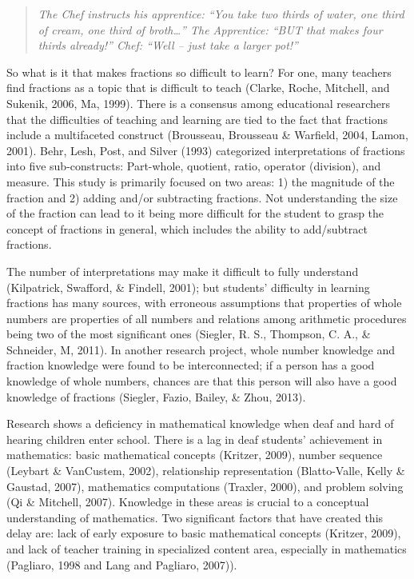 \documentclass[11.5pt]{sig-alternate} %
\begin{document}
\begin{large}
\begin{quote}
\textit{The Chef instructs his apprentice: “You take two thirds of water, one third of cream, one third of broth…” The Apprentice: “BUT that makes four thirds already!” Chef: “Well – just take a larger pot!”}
\end{quote}

So what is it that makes fractions so difficult to learn? For one, many teachers find fractions as a topic that is difficult to teach (Clarke, Roche, Mitchell, and Sukenik, 2006, Ma, 1999). There is a consensus among educational researchers that the difficulties of teaching and learning are tied to the fact that fractions include a multifaceted construct (Brousseau, Brousseau \& Warfield, 2004, Lamon, 2001).  Behr, Lesh, Post, and Silver (1993) categorized interpretations of fractions into five sub-constructs: Part-whole, quotient, ratio, operator (division), and measure. This study is primarily focused on two areas: 1) the magnitude of the fraction and 2) adding and/or subtracting fractions. Not understanding the size of the fraction can lead to it being more difficult for the student to grasp the concept of fractions in general, which includes the ability to add/subtract fractions. 

The number of interpretations may make it difficult to fully understand (Kilpatrick, Swafford, \& Findell, 2001); but students’ difficulty in learning fractions has many sources, with erroneous assumptions that properties of whole numbers are properties of all numbers and relations among arithmetic procedures being two of the most significant ones (Siegler, R. S., Thompson, C. A., \& Schneider, M, 2011). In another research project, whole number knowledge and fraction knowledge were found to be interconnected; if a person has a good knowledge of whole numbers, chances are that this person will also have a good knowledge of fractions (Siegler, Fazio, Bailey, \& Zhou, 2013).  

Research shows a deficiency in mathematical knowledge when deaf and hard of hearing children enter school. There is a lag in deaf students’ achievement in mathematics: basic mathematical concepts (Kritzer, 2009), number sequence (Leybart \& VanCustem, 2002), relationship representation (Blatto-Valle, Kelly \& Gaustad, 2007), mathematics computations (Traxler, 2000), and problem solving (Qi \& Mitchell, 2007). Knowledge in these areas is crucial to a conceptual understanding of mathematics. Two significant factors that have created this delay are: lack of early exposure to basic mathematical concepts (Kritzer, 2009), and lack of teacher training in specialized content area, especially in mathematics (Pagliaro, 1998 and Lang and Pagliaro, 2007)). 


\end{large}
\end{document}
